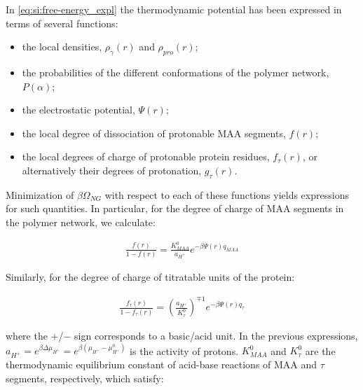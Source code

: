 \documentclass[journal=jacsat,manuscript=suppinfo]{achemso}
\begin{document}
In \cref{eq:si:free-energy_expl} the thermodynamic potential has been expressed in terms of several functions:
%
\begin{itemize}
	\item the local densities, $\rho_\gamma(r)$ and $\rho_{pro}(r)$;
	\item the probabilities of the different conformations of the polymer network, $P(\alpha)$;
	\item the electrostatic potential, $\Psi(r)$;
	\item the local degree of dissociation of protonable MAA segments, $f(r)$;
	\item the local degrees of charge of protonable protein residues, $f_\tau(r)$, or alternatively their degrees of protonation,  $g_\tau(r)$.
\end{itemize}
%
%
%



Minimization of $\beta\Omega_{NG}$ with respect to each of these functions yields expressions for such quantities.
In particular, for the degree of charge of MAA segments in the polymer network, we calculate:



\begin{align}
	\frac{f(r)}{1-f(r)}= \frac{K^0_{MAA}}{a_{H^+}}e^{-\beta \Psi(r) q_{MAA}}
	\label{eq:si:fMAA-degree}
\end{align}

Similarly, for the degree of charge of titratable units of the protein:

\begin{align}
	\frac{f_\tau(r)}{1-f_\tau(r)}= \left(\frac{a_{H^+}}{K^0_{\tau}}\right)^{\mp 1} e^{-\beta \Psi(r) q_{\tau}} 
	\label{eq:si:ftau-degree}
\end{align}



\noindent where the $+$/$-$ sign corresponds to a basic/acid unit.
In the previous expressions, $a_{H^+}=e^{\beta\Delta\mu_{H^+}}=e^{\beta(\mu_{H^+} -\mu^0_{H^+})}$ is the activity of protons.
$K^0_{MAA}$ and $K^0_{\tau}$ are the thermodynamic equilibrium  constant of  acid-base reactions of MAA and $\tau$ segments, respectively, which satisfy:
\end{document}

